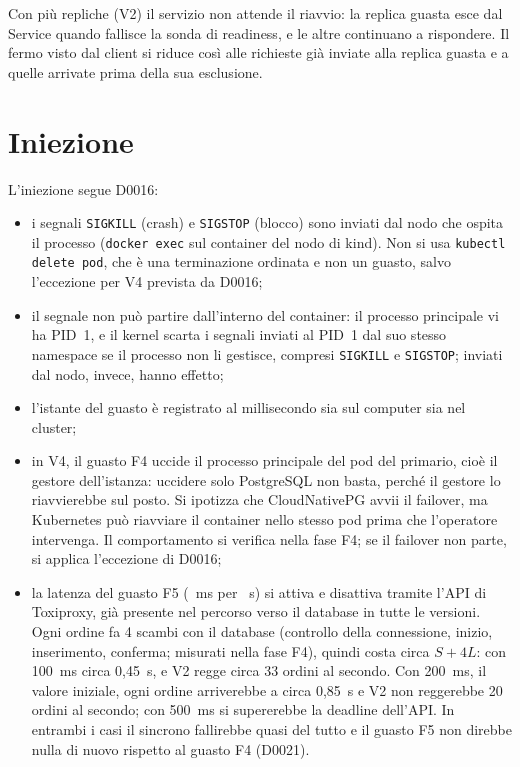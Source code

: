 Con più repliche (V2) il servizio non attende il riavvio: la replica guasta esce dal Service quando fallisce la sonda di readiness, e le altre continuano a rispondere. Il fermo visto dal client si riduce così alle richieste già inviate alla replica guasta e a quelle arrivate prima della sua esclusione.

\section{Iniezione}

L'iniezione segue D0016:

\begin{itemize}
  \item i segnali \texttt{SIGKILL} (crash) e \texttt{SIGSTOP} (blocco) sono inviati dal nodo che ospita il processo (\texttt{docker exec} sul container del nodo di kind). Non si usa \texttt{kubectl delete pod}, che è una terminazione ordinata e non un guasto, salvo l'eccezione per V4 prevista da D0016;
  \item il segnale non può partire dall'interno del container: il processo principale vi ha PID~1, e il kernel scarta i segnali inviati al PID~1 dal suo stesso namespace se il processo non li gestisce, compresi \texttt{SIGKILL} e \texttt{SIGSTOP}; inviati dal nodo, invece, hanno effetto;
  \item l'istante del guasto è registrato al millisecondo sia sul computer sia nel cluster;
  \item in V4, il guasto F4 uccide il processo principale del pod del primario, cioè il gestore dell'istanza: uccidere solo PostgreSQL non basta, perché il gestore lo riavvierebbe sul posto. Si ipotizza che CloudNativePG avvii il failover, ma Kubernetes può riavviare il container nello stesso pod prima che l'operatore intervenga. Il comportamento si verifica nella fase F4; se il failover non parte, si applica l'eccezione di D0016;
  \item la latenza del guasto F5 (~ms per ~s) si attiva e disattiva tramite l'API di Toxiproxy, già presente nel percorso verso il database in tutte le versioni. Ogni ordine fa 4 scambi con il database (controllo della connessione, inizio, inserimento, conferma; misurati nella fase F4), quindi costa circa $S + 4L$: con 100~ms circa 0,45~s, e V2 regge circa 33 ordini al secondo. Con 200~ms, il valore iniziale, ogni ordine arriverebbe a circa 0,85~s e V2 non reggerebbe 20 ordini al secondo; con 500~ms si supererebbe la deadline dell'API. In entrambi i casi il sincrono fallirebbe quasi del tutto e il guasto F5 non direbbe nulla di nuovo rispetto al guasto F4 (D0021).
\end{itemize}
